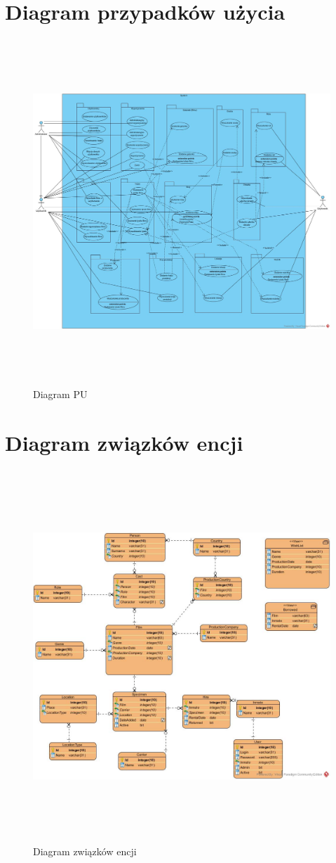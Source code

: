\documentclass{article}
\begin{document}
	\section{Diagram przypadków użycia}
	\begin{figure}[!ht]	
		\centering
		\includegraphics[height=13cm]{PU.jpg}
		\caption{Diagram PU}
		\label{fig:obrazek 1}
	\end{figure}
\newpage
	\section{Diagram związków encji}
		\begin{figure}[!ht]	
		\centering
		\includegraphics[height=14cm]{diagram_zwiazkow_encji.jpg}
		\caption{Diagram związków encji}
		\label{fig:obrazek 2}
	\end{figure}
\end{document}
